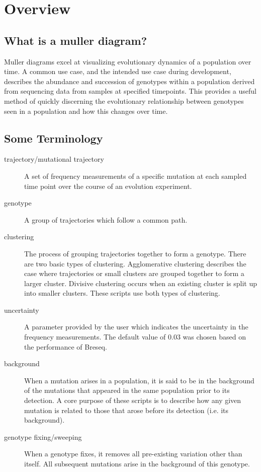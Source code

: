 \documentclass{report}
\begin{document}
\chapter{Overview}

\section{What is a muller diagram?}

Muller diagrams excel at visualizing evolutionary dynamics of a population over time. 
A common use case, and the intended use case during development, describes the abundance and succession of genotypes within a population derived from 
sequencing data from samples at specified timepoints. 
This provides a useful method of quickly discerning the evolutionary relationship between genotypes seen in a population and how this changes over time.


\section{Some Terminology}

\begin{description}
\item[trajectory/mutational trajectory] A set of frequency measurements of a specific mutation at each sampled time point over the course of an evolution experiment.

\item[genotype] A group of trajectories which follow a common path.

\item[clustering] The process of grouping trajectories together to form a genotype. There are two basic types of clustering. Agglomerative clustering describes the case where trajectories or small clusters are grouped together to form a larger cluster. Divisive clustering occurs when an existing cluster is split up into smaller clusters. These scripts use both types of clustering.

\item[uncertainty] A parameter provided by the user which indicates the uncertainty in the frequency measurements. The default value of 0.03 was chosen based on the performance of Breseq.

\item[background] When a mutation arises in a population, it is said to be in the background of the mutations that appeared in the same population prior to its detection. A core purpose of these scripts is to describe how any given mutation is related to those that arose before its detection (i.e. its background).

\item[genotype fixing/sweeping] When a genotype fixes, it removes all pre-existing variation other than itself. All subsequent mutations arise in the background of this genotype.
\end{description}
\end{document}
